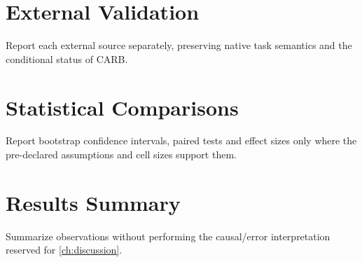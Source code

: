 \section{External Validation}
Report each external source separately, preserving native task semantics and the conditional status of CARB.

\section{Statistical Comparisons}
Report bootstrap confidence intervals, paired tests and effect sizes only where the pre-declared assumptions and cell sizes support them.

\section{Results Summary}
Summarize observations without performing the causal/error interpretation reserved for \cref{ch:discussion}.

